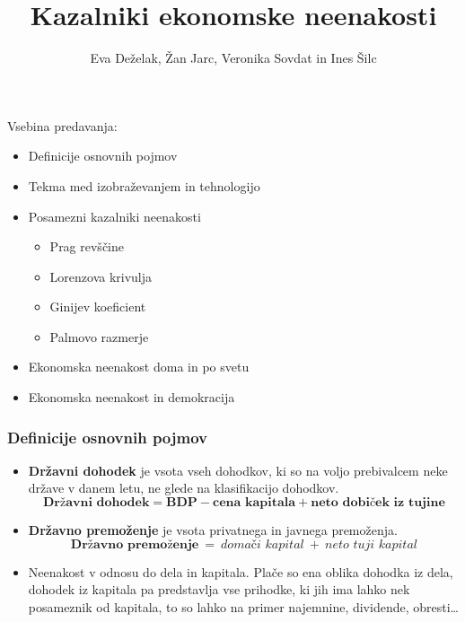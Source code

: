 \documentclass[10pt]{beamer}
\begin{document}
\title[Kazalniki ekonomske neenakosti]{Kazalniki ekonomske neenakosti}
\author{Eva Deželak, Žan Jarc, Veronika Sovdat in Ines Šilc}

\begin{frame}
	\titlepage
\end {frame}

\begin{frame}
Vsebina predavanja:
	\begin{itemize}
		\item Definicije osnovnih pojmov
		\item Tekma med izobraževanjem in tehnologijo
		\item Posamezni kazalniki neenakosti
			\begin{itemize}
				\item Prag revščine
				\item Lorenzova krivulja
				\item Ginijev koeficient
				\item Palmovo razmerje
			\end{itemize}
		\item Ekonomska neenakost doma in po svetu
		\item Ekonomska neenakost in demokracija
	\end{itemize}
\end {frame}

\begin{frame}
\frametitle{Definicije osnovnih pojmov}
\begin{itemize}
\item \textbf{Državni dohodek} je vsota vseh dohodkov, ki so na voljo prebivalcem neke države v danem letu, ne glede na klasifikacijo dohodkov.
$$
\textbf{Državni dohodek} = \textbf{BDP} - \textbf{cena kapitala} + \textbf{neto dobiček iz tujine}
$$
\item \textbf{Državno premoženje} je vsota privatnega in javnega premoženja.
$$
\textbf{Državno premoženje}~=~\textit{domači kapital}~+~\textit{neto tuji kapital}
$$
\item Neenakost v odnosu do dela in kapitala. Plače so ena oblika dohodka iz dela, dohodek iz kapitala pa predstavlja vse prihodke, ki jih ima lahko nek posameznik od kapitala, to so lahko na primer najemnine, dividende, obresti\dots
\end{itemize}
\end{frame}
\end{document}

